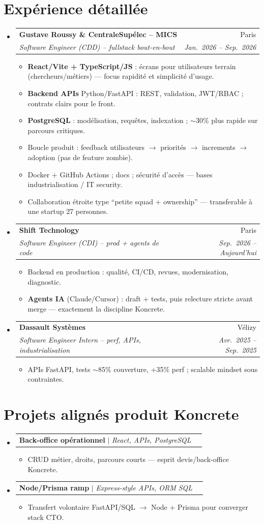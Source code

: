 \documentclass[a4paper,10.5pt]{article}
\makeatletter
\newcommand{\resumeItem}[1]{\item\small{#1}}
\newcommand{\resumeSubheading}[4]{\vspace{2.5pt}\item\begin{tabular*}{0.97\textwidth}[t]{l@{\extracolsep{\fill}}r}\textbf{#1}&{#2}\\\textit{\small #3}&\textit{\small #4}\\\end{tabular*}\vspace{1pt}}
\newcommand{\resumeProjectHeading}[2]{\vspace{1.5pt}\item\begin{tabular*}{0.97\textwidth}{l@{\extracolsep{\fill}}r}\small #1&#2\\\end{tabular*}\vspace{1pt}}
\newcommand{\resumeSubHeadingListStart}{\begin{itemize}[leftmargin=0.08in,label={}]}
\newcommand{\resumeSubHeadingListEnd}{\end{itemize}}
\makeatother
\begin{document}
\section{Exp\'erience d\'etaill\'ee}
\resumeSubHeadingListStart
  \resumeSubheading
    {Gustave Roussy \& CentraleSup\'elec -- MICS}{Paris}
    {Software Engineer (CDD) -- fullstack bout-en-bout}{Jan.~2026 -- Sep.~2026}
    \begin{itemize}
      \resumeItem{\textbf{React/Vite + TypeScript/JS} : \'ecrans pour utilisateurs terrain (chercheurs/m\'etiers) --- focus rapidit\'e et simplicit\'e d'usage.}
      \resumeItem{\textbf{Backend APIs} Python/FastAPI : REST, validation, JWT/RBAC ; contrats clairs pour le front.}
      \resumeItem{\textbf{PostgreSQL} : mod\'elisation, requ\^etes, indexation ; $\sim$30\% plus rapide sur parcours critiques.}
      \resumeItem{Boucle produit : feedback utilisateurs $\rightarrow$ priorit\'es $\rightarrow$ increments $\rightarrow$ adoption (pas de feature zombie).}
      \resumeItem{Docker + GitHub Actions ; docs ; s\'ecurit\'e d'acc\`es --- bases industrialisation / IT security.}
      \resumeItem{Collaboration \'etroite type ``petite squad + ownership'' --- transferable \`a une startup 27 personnes.}
    \end{itemize}
  \resumeSubheading
    {Shift Technology}{Paris}
    {Software Engineer (CDI) -- prod + agents de code}{Sep.~2026 -- Aujourd'hui}
    \begin{itemize}
      \resumeItem{Backend en production : qualit\'e, CI/CD, revues, modernisation, diagnostic.}
      \resumeItem{\textbf{Agents IA} (Claude/Cursor) : draft + tests, puis relecture stricte avant merge --- exactement la discipline Koncrete.}
    \end{itemize}
  \resumeSubheading
    {Dassault Syst\`emes}{V\'elizy}
    {Software Engineer Intern -- perf, APIs, industrialisation}{Avr.~2025 -- Sep.~2025}
    \begin{itemize}
      \resumeItem{APIs FastAPI, tests $\sim$85\% couverture, +35\% perf ; scalable mindset sous contraintes.}
    \end{itemize}
\resumeSubHeadingListEnd

\section{Projets align\'es produit Koncrete}
\resumeSubHeadingListStart
  \resumeProjectHeading{\textbf{Back-office op\'erationnel} $|$ \emph{React, APIs, PostgreSQL}}{}
  \begin{itemize}\resumeItem{CRUD m\'etier, droits, parcours courts --- esprit devis/back-office Koncrete.}\end{itemize}
  \resumeProjectHeading{\textbf{Node/Prisma ramp} $|$ \emph{Express-style APIs, ORM SQL}}{}
  \begin{itemize}\resumeItem{Transfert volontaire FastAPI/SQL $\rightarrow$ Node + Prisma pour converger stack CTO.}\end{itemize}
\resumeSubHeadingListEnd
\end{document}
